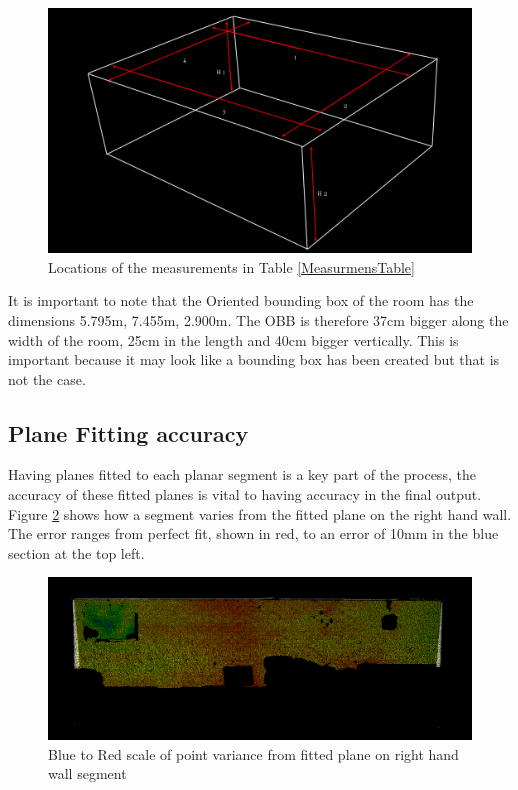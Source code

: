 		
		\begin{figure}[H]
			\centering
			\includegraphics[width=0.7\linewidth]{Includes/images/Results/Selection_013}
			\caption{Locations of the measurements in Table \ref{MeasurmensTable}}
			\label{fig:SourceOfMEasure}
		\end{figure}
		
		\noindent It is important to note that the Oriented bounding box of the room has the dimensions 5.795m, 7.455m, 2.900m. The OBB is therefore 37cm bigger along the width of the room, 25cm in the length and 40cm bigger vertically. This is important because it may look like a bounding box has been created but that is not the case.
		
	\subsection{Plane Fitting accuracy}
		Having planes fitted to each planar segment is a key part of the process, the accuracy of these fitted planes is vital to having accuracy in the final output. Figure \ref{fig:Planefitingaccuracy} shows how a segment varies from the fitted plane on the right hand wall. The error ranges from perfect fit, shown in red, to an error of 10mm in the blue section at the top left.
		
		\begin{figure}[H]
		\centering
		\includegraphics[width=1\linewidth]{"Includes/images/Results/Plane fiting accuracy"}
		\caption{Blue to Red scale of point variance from fitted plane on right hand wall segment }
		\label{fig:Planefitingaccuracy}
		\end{figure}
	

